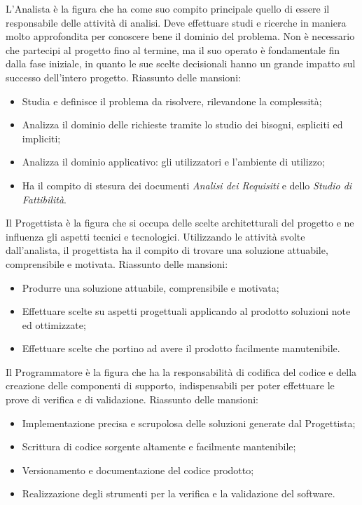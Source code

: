 			L'Analista è la figura che ha come suo compito principale quello di essere il responsabile delle attività di analisi. Deve effettuare studi e ricerche in maniera molto approfondita per conoscere bene il dominio del problema. Non è necessario che partecipi al progetto fino al termine, ma il suo operato è fondamentale fin dalla fase iniziale, in quanto le sue scelte decisionali hanno un grande impatto sul successo dell'intero progetto.
			Riassunto delle mansioni:
			\begin{itemize}
				\item Studia e definisce il problema da risolvere, rilevandone la complessità;
				\item Analizza il dominio delle richieste tramite lo studio dei bisogni, espliciti ed impliciti;
				\item Analizza il dominio applicativo: gli utilizzatori e l'ambiente di utilizzo;
				\item Ha il compito di stesura dei documenti {\it Analisi dei Requisiti} e dello {\it Studio di Fattibilità}.
			\end{itemize}
		
			Il Progettista è la figura che si occupa delle scelte architetturali del progetto e ne influenza gli aspetti tecnici e tecnologici. Utilizzando le attività svolte dall'analista, il progettista ha il compito di trovare una soluzione attuabile, comprensibile e motivata.
			Riassunto delle mansioni:
			\begin{itemize}
				\item Produrre una soluzione attuabile, comprensibile e motivata;
				\item Effettuare scelte su aspetti progettuali applicando al prodotto soluzioni note ed ottimizzate;
				\item Effettuare scelte che portino ad avere il prodotto facilmente manutenibile.
			\end{itemize}
		
			Il Programmatore è la figura che ha la responsabilità di codifica del codice e della creazione delle componenti di supporto, indispensabili per poter effettuare le prove di verifica e di validazione.
			Riassunto delle mansioni:
			\begin{itemize}
				\item Implementazione precisa e scrupolosa delle soluzioni generate dal Progettista;
				\item Scrittura di codice sorgente altamente e facilmente mantenibile;
				\item Versionamento e documentazione del codice prodotto;
				\item Realizzazione degli strumenti per la verifica e la validazione del software.
			\end{itemize}
		
